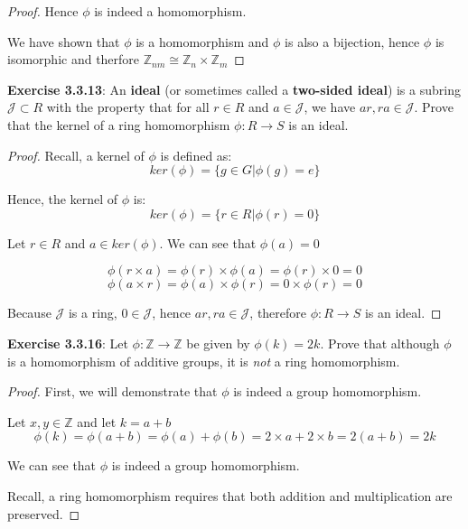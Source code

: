 \documentclass[a4paper]{article}
\begin{document}
\begin{myparindent}{0pt}
\begin{proof}
  Hence $\phi$ is indeed a homomorphism. \newline

  We have shown that $\phi$ is a homomorphism and $\phi$ is also a bijection,
  hence $\phi$ is isomorphic and therfore $\mathbb{Z}_{nm} \cong \mathbb{Z}_n \times \mathbb{Z}_m$
\end{proof}

\textbf{Exercise 3.3.13}:
An \textbf{ideal} (or sometimes called a \textbf{two-sided ideal}) is a
subring $\mathcal{J} \subset R$ with the property that for all
$r \in R$ and $a \in \mathcal{J}$, we have $ar, ra \in \mathcal{J}$.
Prove that the kernel of a ring homomorphism $\phi: R \rightarrow S$ is an ideal.
\newline

\begin{proof}
  Recall, a kernel of $\phi$ is defined as:
  \[ ker(\phi) = \{ g \in G | \phi(g) = e \} \]

  Hence, the kernel of $\phi$ is:
  \[ ker(\phi) = \{ r \in R | \phi(r) = 0 \} \]

  Let $r \in R$ and $a \in ker(\phi)$. We can see that $\phi(a) = 0$

  \[ \phi(r \times a) = \phi(r) \times \phi(a) = \phi(r) \times 0 = 0 \]
  \[ \phi(a \times r) = \phi(a) \times \phi(r) = 0 \times \phi(r) = 0 \]

  Because $\mathcal{J}$ is a ring, $0 \in \mathcal{J}$, hence $ar, ra \in \mathcal{J}$,
  therefore $\phi: R \rightarrow S$ is an ideal.
\end{proof}

\textbf{Exercise 3.3.16}:
Let $\phi: \mathbb{Z} \rightarrow \mathbb{Z}$ be given by $\phi(k) = 2k$. Prove
that although $\phi$ is a homomorphism of additive groups, it is \textit{not}
a ring homomorphism.

\begin{proof}
  First, we will demonstrate that $\phi$ is indeed a group homomorphism. \newline

  Let $x, y \in \mathbb{Z}$ and let $k = a + b$
  \[ \phi(k) = \phi(a + b) = \phi(a) + \phi(b) = 2 \times a + 2 \times b =
  2(a + b) = 2k
  \]

  We can see that $\phi$ is indeed a group homomorphism. \newline

  Recall, a ring homomorphism requires that both addition and multiplication
  are preserved. \newline


\end{proof}
\end{myparindent}
\end{document}
